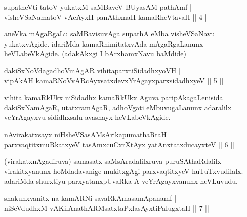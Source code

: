 
\begin{shl}
supatheVti tatoV yukatxM saMBaveV BUyasAM pathAmf | \\
visheVSaNamatoV vAcAyxH panAthxnaH kamaRheVtavaH \hfill|| 4 || 
\end{shl}

\begin{artha}
aneVka mAgaRgaLu saMBavisuvAga supathA eMba visheVSaNavu yukatxvAgide. 
idariMda kamaRnimitatxvAda mAgaRgaLanunx heVLabeVkAgide. (adakAkxgi I 
bArxhamxNavu baMdide)
\end{artha}


\begin{shl}
dakiSxNoVdagadhoVmAgAR vihitaparxtiSidadhxyoVH | \\
vipAkAH kamaRNoVvARcAyxsatxdevxYrAgayxparxsidadhxyeV \hfill|| 5 || 
\end{shl}

\begin{artha}
vihita kamaRkUkx niSidadhx kamaRkUkx Aguva paripAkagaLenisida 
dakiSxNamAgaR, utatxramAgaR, adhoVgati eMbuvugaLanunx adaralilx 
veYrAgayxvu sididhxsalu avashayx heVLabeVkAgide.
\end{artha}


\begin{shl}
nAvirakatxsayx niHsheVSasAMsArikapumathaRtaH | \\
parxvaqtitxmuRkatxyeV tasAmxcuCxrXtAyx yatAnxtatxducayxteV \hfill|| 6 || 
\end{shl}

\begin{artha}
(virakatxnAgadiruva) samasatx saMsAradalilxruva puruSAthaRdalilx 
virakitxyanunx hoMdadavanige mukitxgAgi parxvaqtitxyeV huTuTxvudilalx.
adariMda shurxtiyu parxyatanxpUvaRka A veYrAgayxvanunx heVLuvudu.
\end{artha}


\begin{shl}
shakunxvanitx na kamARNi savaRkAmasamApanamf | \\
niSeVdudhxM vA\s KilAnathARMsatxtaPxlasAyxtiPalugxtaH \hfill|| 7 || 
\end{shl}

